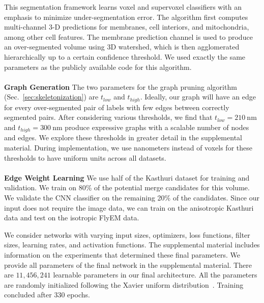 This segmentation framework learns voxel and supervoxel classifiers with an emphasis to minimize under-segmentation error. 
The algorithm first computes multi-channel 3-D predictions for membranes, cell interiors, and mitochondria, among other cell features. 
The membrane prediction channel is used to produce an over-segmented volume using 3D watershed, which is then agglomerated hierarchically up to a certain confidence threshold. 
We used exactly the same parameters as the publicly available code for this algorithm.
\\~\\
\noindent\textbf{Graph Generation}
The two parameters for the graph pruning algorithm (Sec.~\ref{sec:skeletonization}) are $t_{low}$ and $t_{high}$. 
Ideally, our graph will have an edge for every over-segmented pair of labels with few edges between correctly segmented pairs. 
After considering various thresholds, we find that $t_{low} = \SI{210}{\nano\meter}$ and $t_{high} = \SI{300}{\nano\meter}$ produce expressive graphs with a scalable number of nodes and edges.
We explore these thresholds in greater detail in the supplemental material.
During implementation, we use nanometers instead of voxels for these thresholds to have uniform units across all datasets.
\\~\\
\noindent\textbf{Edge Weight Learning}
\label{sec:network-parameters}
We use half of the Kasthuri dataset for training and validation. 
We train on 80\% of the potential merge candidates for this volume.
We validate the CNN classifier on the remaining 20\% of the candidates. 
Since our input does not require the image data, we can train on the anisotropic Kasthuri data and test on the isotropic FlyEM data.

We consider networks with varying input sizes, optimizers, loss functions, filter sizes, learning rates, and activation functions. 
The supplemental material includes information on the experiments that determined these final parameters. 
We provide all parameters of the final network in the supplemental material. 
There are $11,456,241$ learnable parameters in our final architecture. 
All the parameters are randomly initialized following the Xavier uniform distribution~\cite{glorot2010understanding}. 
Training concluded after 330 epochs.

